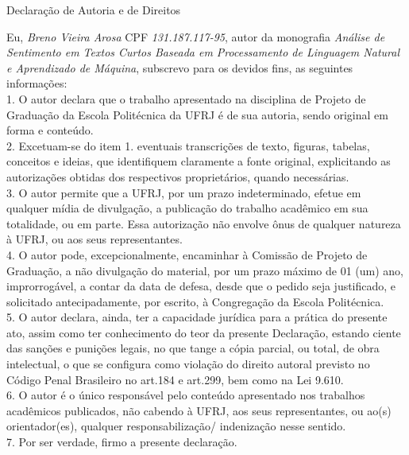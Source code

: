 \begin{center}
Declaração de Autoria e de Direitos
\end{center}

\vspace{0.5cm}

Eu, \emph{Breno Vieira Arosa} CPF \emph{131.187.117-95}, autor da monografia \emph{Análise de Sentimento em Textos Curtos Baseada em Processamento de Linguagem Natural e Aprendizado de Máquina}, subscrevo para os devidos fins, as seguintes informações:\\
1. O autor declara que o trabalho apresentado na disciplina de Projeto de Graduação da Escola Politécnica da UFRJ é de sua autoria, sendo original em forma e conteúdo.\\
2. Excetuam-se do item 1. eventuais transcrições de texto, figuras, tabelas, conceitos e ideias, que identifiquem claramente a fonte original, explicitando as autorizações obtidas dos respectivos proprietários, quando necessárias.\\
3. O autor permite que a UFRJ, por um prazo indeterminado, efetue em qualquer mídia de divulgação, a publicação do trabalho acadêmico em sua totalidade, ou em parte. Essa autorização não envolve ônus de qualquer natureza à UFRJ, ou aos seus representantes.\\
4. O autor pode, excepcionalmente, encaminhar à Comissão de Projeto de Graduação, a não divulgação do material, por um prazo máximo de 01 (um) ano, improrrogável, a contar da data de defesa, desde que o pedido seja justificado, e solicitado antecipadamente, por escrito, à Congregação da Escola Politécnica.\\
5. O autor declara, ainda, ter a capacidade jurídica para a prática do presente ato, assim como ter conhecimento do teor da presente Declaração, estando ciente das sanções e punições legais, no que tange a cópia parcial, ou total, de obra intelectual, o que se configura como violação do direito autoral previsto no Código Penal Brasileiro no art.184 e art.299, bem como na Lei 9.610.\\
6. O autor é o único responsável pelo conteúdo apresentado nos trabalhos acadêmicos publicados, não cabendo à UFRJ, aos seus representantes,  ou ao(s) orientador(es), qualquer responsabilização/ indenização nesse sentido.\\
7. Por ser verdade, firmo a presente declaração.\\

      \vspace{0.5cm}
      \begin{flushright}
         \parbox{10cm}{
            \hrulefill

            \vspace{-.375cm}

            \vspace{0.1cm}
         }
      \end{flushright}

